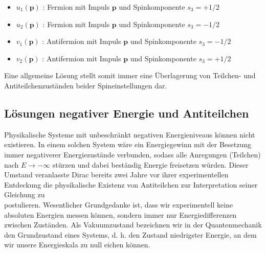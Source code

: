 \documentclass[10pt, letterpaper]{article}
\begin{document}
\begin{itemize}
  \item $u_{1}(\mathbf{p})$ : Fermion mit Impuls $\mathbf{p}$ und Spinkomponente $s_{3}=+1 / 2$
  \item $u_{2}(\mathbf{p})$ : Fermion mit Impuls $\mathbf{p}$ und Spinkomponente $s_{3}=-1 / 2$
  \item $v_{1}(\mathbf{p})$ : Antifermion mit Impuls $\mathbf{p}$ und Spinkomponente $s_{3}=-1 / 2$
  \item $v_{2}(\mathbf{p})$ : Antifermion mit Impuls $\mathbf{p}$ und Spinkomponente $s_{3}=+1 / 2$
\end{itemize}

Eine allgemeine Lösung stellt somit immer eine Überlagerung von Teilchen- und Antiteilchenzuständen beider Spineinstellungen dar.

\pagebreak

\subsection{Lösungen negativer Energie und Antiteilchen}

Physikalische Systeme mit unbeschränkt negativen Energieniveaus können nicht existieren. In einem solchen System wäre ein Energiegewinn mit der Besetzung immer negativerer Energiezustände verbunden, sodass alle Anregungen (Teilchen) nach $E \rightarrow-\infty$ stürzen und dabei beständig Energie freisetzen würden. Dieser Umstand veranlasste Dirac bereits zwei Jahre vor ihrer experimentellen Entdeckung die physikalische Existenz von Antiteilchen zur Interpretation seiner Gleichung zu\\
postulieren. Wesentlicher Grundgedanke ist, dass wir experimentell keine absoluten Energien messen können, sondern immer nur Energiedifferenzen zwischen Zuständen. Als Vakuumzustand bezeichnen wir in der Quantenmechanik den Grundzustand eines Systems, d. h. den Zustand niedrigster Energie, an dem wir unsere Energieskala zu null eichen können.
\end{document}
